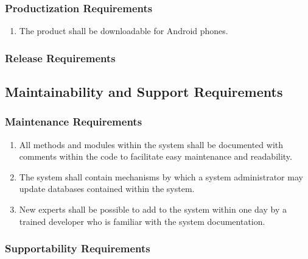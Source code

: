 \documentclass[12pt,letterpaper]{article}
\begin{document}
\subsubsection{Productization Requirements}
\label{ssub:productization_requirements}
\begin{enumerate}[{OE-P}1. ]
	\item The product shall be downloadable for Android phones.
\end{enumerate}

\subsubsection{Release Requirements}
\label{ssub:release_requirements}


\subsection{Maintainability and Support Requirements}
\label{sub:maintainability_and_support_requirements}

\subsubsection{Maintenance Requirements}
\label{ssub:maintenance_requirements}
\begin{enumerate}[{MS-M}1. ]
	\item All methods and modules within the system shall be documented with comments within the code to facilitate easy maintenance and readability.
	
	\item The system shall contain mechanisms by which a system administrator may update databases contained within the system.
	
	\item New experts shall be possible to add to the system within one day by a trained developer who is familiar with the system documentation.
\end{enumerate}

\subsubsection{Supportability Requirements}
\label{ssub:supportability_requirements}
\end{document}
